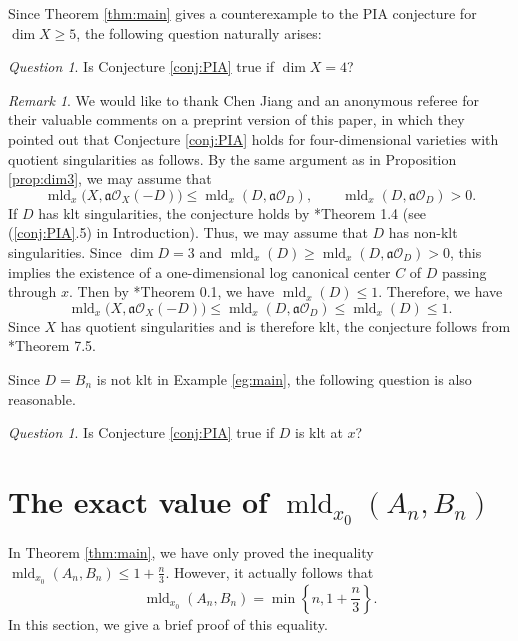 \documentclass[a4paper,11pt]{amsart}
\theoremstyle{definition}
\theoremstyle{remark}
\newtheorem{rmk}[thm]{Remark}
\newtheorem{quest}[thm]{Question}
\begin{document}
Since Theorem \ref{thm:main} gives a counterexample to the PIA conjecture for $\dim X \ge 5$, 
the following question naturally arises: 

\begin{quest}\label{quest:dim4}
Is Conjecture \ref{conj:PIA} true if $\dim  X =4$? 
\end{quest}

\begin{rmk}
We would like to thank Chen Jiang and an anonymous referee for their valuable comments on a preprint version of this paper, in which they pointed out that Conjecture \ref{conj:PIA} holds for four-dimensional varieties with quotient singularities as follows. 
By the same argument as in Proposition \ref{prop:dim3}, we may assume that 
\[
\operatorname{mld}_x \bigl( X, \mathfrak{a} \mathcal{O}_X(-D) \bigr) \le \operatorname{mld}_x (D, \mathfrak{a} \mathcal{O}_D), \qquad 
\operatorname{mld}_x (D, \mathfrak{a} \mathcal{O}_D) >0.
\]
If $D$ has klt singularities, the conjecture holds by \cite{NS22}*{Theorem 1.4} (see (\ref{conj:PIA}.5) in Introduction). 
Thus, we may assume that $D$ has non-klt singularities. 
Since $\dim D = 3$ and $\operatorname{mld}_x (D) \ge \operatorname{mld}_x (D, \mathfrak{a} \mathcal{O}_D)>0$, this implies the existence of a one-dimensional log canonical center $C$ of $D$ passing through $x$. 
Then by \cite{Amb99}*{Theorem 0.1}, we have $\operatorname{mld}_x (D) \le 1$. 
Therefore, we have 
\[
\operatorname{mld}_x \bigl( X, \mathfrak{a} \mathcal{O}_X(-D) \bigr) \le \operatorname{mld}_x (D, \mathfrak{a} \mathcal{O}_D) \le \operatorname{mld}_x (D) \le 1. 
\]
Since $X$ has quotient singularities and is therefore klt, 
the conjecture follows from \cite{Kaw21}*{Theorem 7.5}. 
\end{rmk}


\noindent
Since $D = B_n$ is not klt in Example \ref{eg:main}, the following question is also reasonable. 

\begin{quest}\label{quest:PIAm}
Is Conjecture \ref{conj:PIA} true if $D$ is klt at $x$? 
\end{quest}

\appendix

\section{The exact value of $\operatorname{mld}_{x_0}(A_n, B_n)$}\label{section:exact}
In Theorem \ref{thm:main}, we have only proved the inequality $\operatorname{mld}_{x_0}(A_n, B_n) \le 1 + \frac{n}{3}$. 
However, it actually follows that
\[
\operatorname{mld}_{x_0}(A_n, B_n)  = \min \left \{ n, 1 + \frac{n}{3} \right \}. \tag{$\diamondsuit$}
\]
In this section, we give a brief proof of this equality. 
\end{document}
